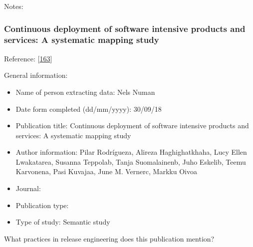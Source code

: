 \documentclass[]{book}
\providecommand{\tightlist}{%
  \setlength{\itemsep}{0pt}\setlength{\parskip}{0pt}}
\begin{document}
Notes:

\subsubsection{Continuous deployment of software intensive products and
services: A systematic mapping
study}\label{continuous-deployment-of-software-intensive-products-and-services-a-systematic-mapping-study}

Reference: {[}\protect\hyperlink{ref-rodriguez2017a}{163}{]}

General information:

\begin{itemize}
\tightlist
\item
  Name of person extracting data: Nels Numan
\item
  Date form completed (dd/mm/yyyy): 30/09/18
\item
  Publication title: Continuous deployment of software intensive
  products and services: A systematic mapping study
\item
  Author information: Pilar Rodrígueza, Alireza Haghighatkhaha, Lucy
  Ellen Lwakatarea, Susanna Teppolab, Tanja Suomalainenb, Juho Eskelib,
  Teemu Karvonena, Pasi Kuvajaa, June M. Vernerc, Markku Oivoa
\item
  Journal:
\item
  Publication type:
\item
  Type of study: Semantic study
\end{itemize}

What practices in release engineering does this publication mention?
\end{document}
